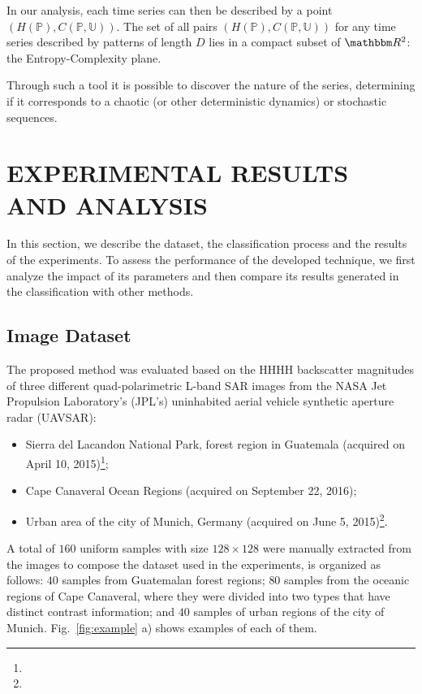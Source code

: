 \documentclass[journal]{IEEEtran}
\begin{document}
	In our analysis, each time series can then be described by a point $(H(\mathbb{P}), C(\mathbb{P}, \mathbb{U}))$.
	The set of all pairs $(H(\mathbb{P}), C(\mathbb{P}, \mathbb{U}))$ for any time series described by patterns of length $D$ lies in a compact subset of $\mathbbm R^2$: the Entropy-Complexity plane. 
	
	Through such a tool it is possible to discover the nature of the series, determining if it corresponds to a chaotic (or other deterministic dynamics) or stochastic sequences.
	
	\section{EXPERIMENTAL RESULTS AND ANALYSIS}\label{Results}
	
	In this section, we describe the dataset, the classification process and the results of the experiments.
	To assess the performance of the developed technique, we first analyze the impact of its parameters and then compare its results generated in the classification with other methods.
	
	\subsection{Image Dataset}
	
	The proposed method was evaluated based on the HHHH backscatter magnitudes of three different quad-polarimetric L-band SAR images from the NASA Jet Propulsion Laboratory’s (JPL’s) uninhabited aerial vehicle synthetic aperture radar (UAVSAR):
	\begin{itemize}
		\item Sierra del Lacandon National Park, forest region in Guatemala (acquired on April 10, 2015)\footnote{};
		\item Cape Canaveral Ocean Regions (acquired on September 22, 2016);
		\item Urban area of the city of Munich, Germany (acquired on June 5, 2015)\footnote{}.
	\end{itemize}
	
	A total of $160$ uniform samples with size $128 \times 128$ were manually extracted from the images to compose the dataset used in the experiments, is organized as follows:
	$40$ samples from Guatemalan forest regions;
	$80$ samples from the oceanic regions of Cape Canaveral, where they were divided into two types that have distinct contrast information; and
	$40$ samples of urban regions of the city of Munich.
	Fig.~\ref{fig:example} a) shows examples of each of them.
	
\end{document}

